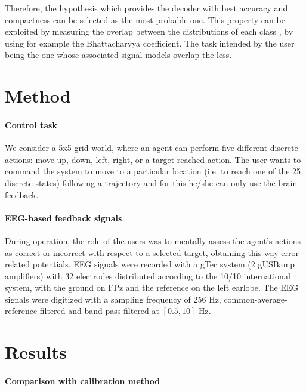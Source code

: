 \documentclass[]{article}
\newcommand{\sectionspace}{\vspace{-0.3cm}}
\begin{document}
Therefore, the hypothesis which provides the decoder with best accuracy and compactness can be selected as the most probable one. This property can be exploited by measuring the overlap between the distributions of each class \cite{grizou2014calibration}, by using for example the Bhattacharyya coefficient. The task intended by the user being the one whose associated signal models overlap the less.

\sectionspace
\section{Method}
\sectionspace

\paragraph{Control task} We consider a 5x5 grid world, where an agent can perform five different discrete actions: move up, down, left, right, or a target-reached action. The user wants to command the system to move to a particular location (i.e. to reach one of the 25 discrete states) following a trajectory and for this he/she can only use the brain feedback. 


\paragraph{EEG-based feedback signals} During operation, the role of the users was to mentally assess the agent's actions as correct or incorrect with respect to a selected target, obtaining this way error-related potentials. EEG signals were recorded with a gTec system (2 gUSBamp amplifiers) with 32 electrodes distributed according to the 10/10 international system, with the ground on FPz and the reference on the left earlobe. The EEG signals were digitized with a sampling frequency of $256$ Hz, common-average-reference filtered and band-pass filtered at $[0.5, 10]$ Hz.

\sectionspace
\section{Results}
\sectionspace

\paragraph{Comparison with calibration method}
\end{document}
